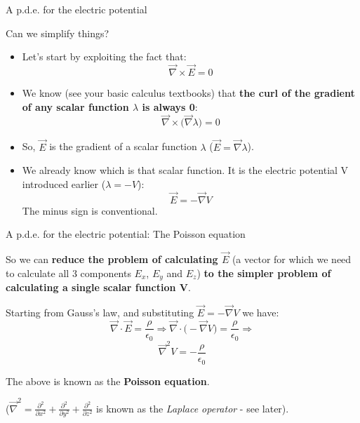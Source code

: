 \begin{frame}{A p.d.e. for the electric potential}

Can we simplify things?

\begin{itemize}
  \item Let's start by exploiting the fact that:
        \begin{equation*}
           \vec{\nabla} \times \vec{E} = 0
        \end{equation*}
  \item We know (see your basic calculus textbooks)
        that {\bf the curl of the gradient of any scalar function $\lambda$ is always 0}:
        \begin{equation*}
           \vec{\nabla} \times \Big( \vec{\nabla} \lambda \Big) = 0
        \end{equation*}
  \item So, $\vec{E}$ is the gradient of a scalar function $\lambda$ ($\vec{E} = \vec{\nabla} \lambda$).
  \item We already know which is that scalar function.
        It is the electric potential V introduced earlier ($\lambda = -V$):
        \begin{equation*}
           \vec{E} = - \vec{\nabla} V
        \end{equation*}
        The minus sign is conventional.
\end{itemize}

\end{frame}

%
%
%

\begin{frame}{A p.d.e. for the electric potential: The Poisson equation}

So we can {\bf reduce the problem of calculating $\vec{E}$}
(a vector for which we need to calculate all 3 components $E_x$, $E_y$ and $E_z$)
{\bf to the simpler problem of calculating a single scalar function V}.\\
\vspace{0.3cm}

Starting from Gauss's law, and substituting $\vec{E} = - \vec{\nabla} V$ we have:
\begin{equation*}
  \vec{\nabla} \cdot \vec{E} = \frac{\rho}{\epsilon_0} \Rightarrow
  \vec{\nabla} \cdot \Big( - \vec{\nabla} V \Big) = \frac{\rho}{\epsilon_0} \Rightarrow
\end{equation*}
\begin{equation*}
  \vec{\nabla}^{2} V = - \frac{\rho}{\epsilon_0}
\end{equation*}

The above is known as the {\bf Poisson equation}.\\
\vspace{0.3cm}

($\vec{\nabla}^{2} = \frac{\partial^2}{\partial x^2} + \frac{\partial^2}{\partial y^2} + \frac{\partial^2}{\partial z^2}$
is known as the {\em Laplace operator} - see later).

\end{frame}

